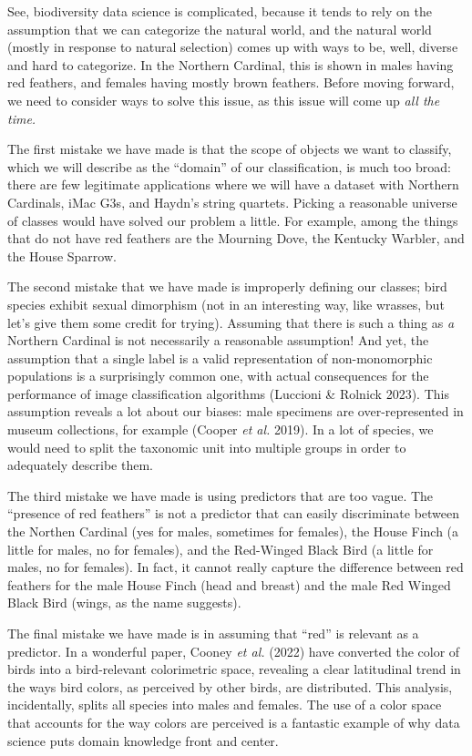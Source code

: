 \documentclass[
  letterpaper,
]{scrbook}
\begin{document}
See, biodiversity data science is complicated, because it tends to rely
on the assumption that we can categorize the natural world, and the
natural world (mostly in response to natural selection) comes up with
ways to be, well, diverse and hard to categorize. In the Northern
Cardinal, this is shown in males having red feathers, and females having
mostly brown feathers. Before moving forward, we need to consider ways
to solve this issue, as this issue will come up \emph{all the time.}

The first mistake we have made is that the scope of objects we want to
classify, which we will describe as the ``domain'' of our
classification, is much too broad: there are few legitimate applications
where we will have a dataset with Northern Cardinals, iMac G3s, and
Haydn's string quartets. Picking a reasonable universe of classes would
have solved our problem a little. For example, among the things that do
not have red feathers are the Mourning Dove, the Kentucky Warbler, and
the House Sparrow.

The second mistake that we have made is improperly defining our classes;
bird species exhibit sexual dimorphism (not in an interesting way, like
wrasses, but let's give them some credit for trying). Assuming that
there is such a thing as \emph{a} Northern Cardinal is not necessarily a
reasonable assumption! And yet, the assumption that a single label is a
valid representation of non-monomorphic populations is a surprisingly
common one, with actual consequences for the performance of image
classification algorithms (Luccioni \& Rolnick 2023). This assumption
reveals a lot about our biases: male specimens are over-represented in
museum collections, for example (Cooper \emph{et al.} 2019). In a lot of
species, we would need to split the taxonomic unit into multiple groups
in order to adequately describe them.

The third mistake we have made is using predictors that are too vague.
The ``presence of red feathers'' is not a predictor that can easily
discriminate between the Northen Cardinal (yes for males, sometimes for
females), the House Finch (a little for males, no for females), and the
Red-Winged Black Bird (a little for males, no for females). In fact, it
cannot really capture the difference between red feathers for the male
House Finch (head and breast) and the male Red Winged Black Bird (wings,
as the name suggests).

The final mistake we have made is in assuming that ``red'' is relevant
as a predictor. In a wonderful paper, Cooney \emph{et al.} (2022) have
converted the color of birds into a bird-relevant colorimetric space,
revealing a clear latitudinal trend in the ways bird colors, as
perceived by other birds, are distributed. This analysis, incidentally,
splits all species into males and females. The use of a color space that
accounts for the way colors are perceived is a fantastic example of why
data science puts domain knowledge front and center.
\end{document}
